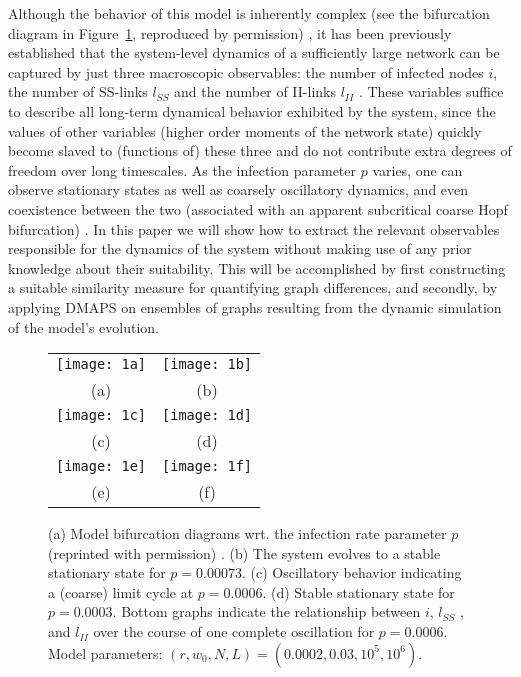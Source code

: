 Although the behavior of this model is inherently complex (see the
bifurcation diagram in Figure~\ref{fig:sis1}, reproduced by
permission) \cite{gross_robust_2008}, it has been previously
established that the system-level dynamics of a sufficiently large
network can be captured by just three macroscopic observables: the
number of infected nodes $i$, the number of SS-links $l_{SS}$ and the
number of II-links $l_{II}$ . These variables suffice to describe all
long-term dynamical behavior exhibited by the system, since the values
of other variables (higher order moments of the network state) quickly
become slaved to (functions of) these three and do not contribute
extra degrees of freedom over long timescales. As the infection
parameter $p$ varies, one can observe stationary states as well as
coarsely oscillatory dynamics, and even coexistence between the two
(associated with an apparent subcritical coarse Hopf bifurcation)
\cite{holmes_turbulence_2012}.  In this paper we will show how to
extract the relevant observables responsible for the dynamics of the
system without making use of any prior knowledge about their
suitability. This will be accomplished by first constructing a
suitable similarity measure for quantifying graph differences, and
secondly, by applying DMAPS on ensembles of graphs resulting from the
dynamic simulation of the model’s evolution.

\begin{figure}[!htp]
\centering
\begin{tabular}{cc}
  \texttt{[image: 1a]} &
  \texttt{[image: 1b]}\\
  (a) & (b)\\
  \texttt{[image: 1c]} &
  \texttt{[image: 1d]}\\
  (c) & (d) \\
  \texttt{[image: 1e]} &
  \texttt{[image: 1f]}\\
  (e) & (f)
\end{tabular}
\caption[Quantitative behavior of SIS model]{(a) Model bifurcation diagrams wrt. the infection rate
  parameter $p$ (reprinted with permission)
  \cite{gross_epidemic_2006}. (b) The system evolves to a stable
  stationary state for $p = 0.00073$. (c) Oscillatory behavior
  indicating a (coarse) limit cycle at $p = 0.0006$. (d) Stable
  stationary state for $p = 0.0003$. Bottom graphs indicate the
  relationship between $i$, $l_{SS}$ , and $l_{II}$ over the course of
  one complete oscillation for $p = 0.0006$. Model parameters:
  $(r, w_0, N, L) = (0.0002, 0.03, 10^5 , 10^6)$. \label{fig:sis1}}
\end{figure}


